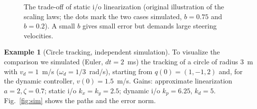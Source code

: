 \documentclass[11pt,a4paper]{article}
\def\bm#1{#1}%
\def\vect#1{#1}%
\newcommand{\vect}[1]{\bm{#1}}
\newcommand{\vd}{v_d}
\newcommand{\omd}{\omega_d}
\theoremstyle{definition}
\newtheorem{example}[definition]{Example}
\theoremstyle{plain}
\theoremstyle{remark}
\begin{document}
\begin{figure}[H]
\centering
{}
\caption{The trade-off of static i/o linearization (original illustration of the scaling laws; the dots mark the two cases simulated, $b=0.75$ and $b=0.2$). A small $b$ gives small error but demands large steering velocities.}
\label{fig:tradeoff}
\end{figure}

\begin{example}[Circle tracking, independent simulation]
To visualize the comparison we simulated (Euler, $dt=2$~ms) the tracking of a circle of radius $3$~m with $\vd=1$~m/s ($\omd=1/3$~rad/s), starting from $\vect q(0)=(1,-1,2)$ and, for the dynamic controller, $v(0)=1.5$~m/s. Gains: approximate linearization $a=2,\zeta=0.7$; static i/o $k_x=k_y=2.5$; dynamic i/o $k_p=6.25$, $k_d=5$. Fig.~\ref{fig:sim} shows the paths and the error norm.
\end{example}
\end{document}
